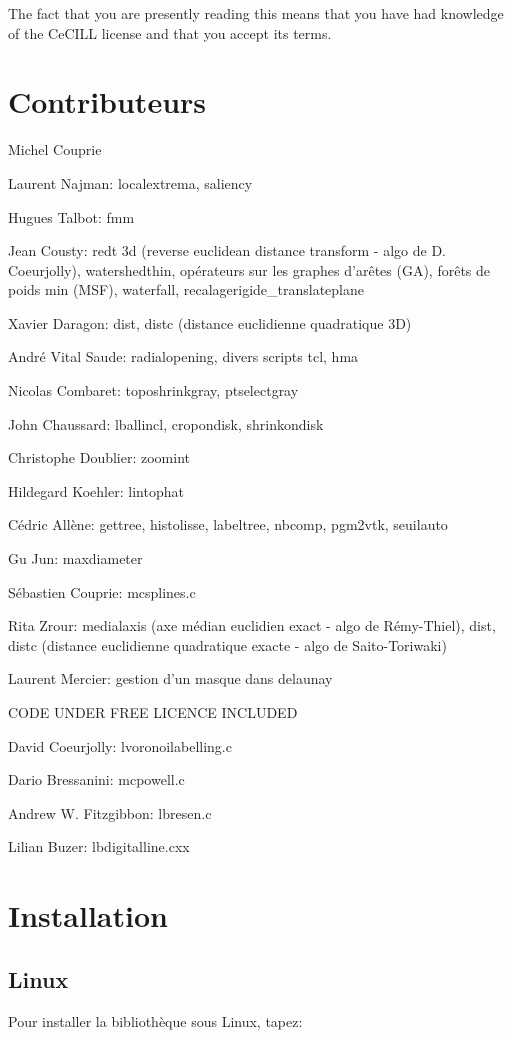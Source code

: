 The fact that you are presently reading this means that you have had knowledge of the Ce\-CILL license and that you accept its terms.\section{Contributeurs}\label{index_contributors}
Michel Couprie\par
 Laurent Najman: localextrema, saliency\par
 Hugues Talbot: fmm \par
 Jean Cousty: redt 3d (reverse euclidean distance transform - algo de D. Coeurjolly), watershedthin, op\'{e}rateurs sur les graphes d'ar\^{e}tes (GA), for\^{e}ts de poids min (MSF), waterfall, recalagerigide\_\-translateplane\par
 Xavier Daragon: dist, distc (distance euclidienne quadratique 3D)\par
 Andr\'{e} Vital Saude: radialopening, divers scripts tcl, hma\par
 Nicolas Combaret: toposhrinkgray, ptselectgray\par
 John Chaussard: lballincl, cropondisk, shrinkondisk\par
 Christophe Doublier: zoomint\par
 Hildegard Koehler: lintophat\par
 C\'{e}dric All\`{e}ne: gettree, histolisse, labeltree, nbcomp, pgm2vtk, seuilauto\par
 Gu Jun: maxdiameter\par
 S\'{e}bastien Couprie: mcsplines.c\par
 Rita Zrour: medialaxis (axe m\'{e}dian euclidien exact - algo de R\'{e}my-Thiel), dist, distc (distance euclidienne quadratique exacte - algo de Saito-Toriwaki)\par
 Laurent Mercier: gestion d'un masque dans delaunay\par


CODE UNDER FREE LICENCE INCLUDED

David Coeurjolly: lvoronoilabelling.c\par
 Dario Bressanini: mcpowell.c\par
 Andrew W. Fitzgibbon: lbresen.c\par
 Lilian Buzer: lbdigitalline.cxx\section{Installation}\label{index_install}
\subsection{Linux}\label{index_linux}
Pour installer la biblioth\`{e}que sous Linux, tapez: 

